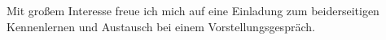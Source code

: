 		Mit großem Interesse freue ich mich auf eine Einladung zum beiderseitigen Kennenlernen und Austausch bei einem Vorstellungsgespräch.